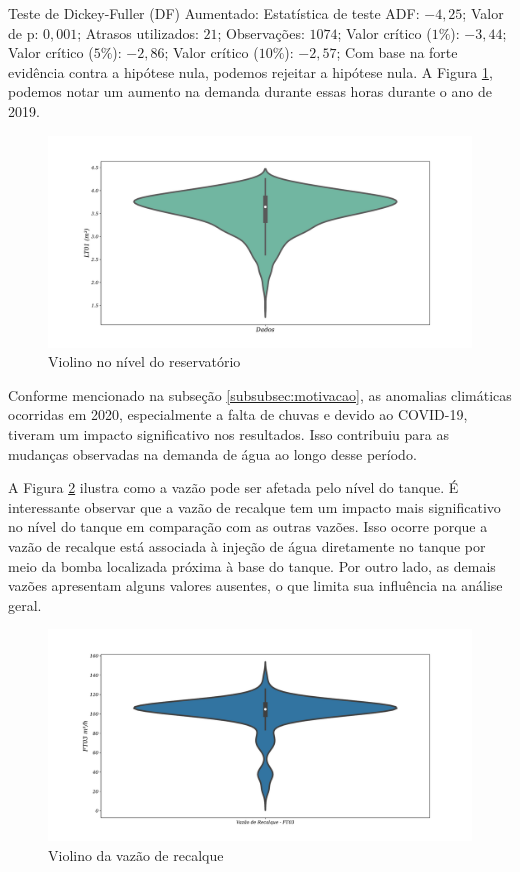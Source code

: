Teste de Dickey-Fuller (DF) Aumentado:
Estatística de teste ADF: $-4,25$;
Valor de p: $0,001$;
Atrasos utilizados: $21$;
Observações: $1074$;
Valor crítico ($1\%$): $-3,44$;
Valor crítico ($5\%$): $-2,86$;
Valor crítico ($10\%$): $-2,57$;
Com base na forte evidência contra a hipótese nula, podemos rejeitar a hipótese nula. A Figura \ref{fig:hist}, podemos notar um aumento na demanda durante essas horas durante o ano de 2019.
	
	
	\begin{figure}[!htb]
		\centering
		\caption{Violino no nível do reservatório}
		\label{fig:hist}
		\includegraphics[width=0.9\linewidth]{Resultados/Figuras/viol}
		

	\end{figure}
	
Conforme mencionado na subseção \ref{subsubsec:motivacao}, as anomalias climáticas ocorridas em 2020, especialmente a falta de chuvas e devido ao COVID-19, tiveram um impacto significativo nos resultados. Isso contribuiu para as mudanças observadas na demanda de água ao longo desse período.



A Figura \ref{fig:ft03} ilustra como a vazão pode ser afetada pelo nível do tanque. É interessante observar que a vazão de recalque tem um impacto mais significativo no nível do tanque em comparação com as outras vazões. Isso ocorre porque a vazão de recalque está associada à injeção de água diretamente no tanque por meio da bomba localizada próxima à base do tanque. Por outro lado, as demais vazões apresentam alguns valores ausentes, o que limita sua influência na análise geral.	
	
	
	\begin{figure}[!htb]
		\centering
		\caption{Violino da vazão de recalque}
		\label{fig:ft03}
		\includegraphics[width=0.9\linewidth]{Resultados/Figuras/ft03}
		

	\end{figure}


